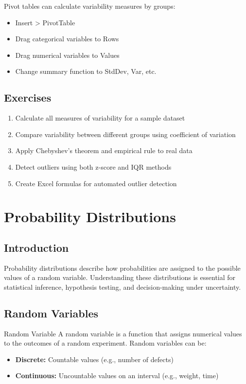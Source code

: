 \documentclass[12pt,a4paper]{book}
\begin{document}
Pivot tables can calculate variability measures by groups:
\begin{itemize}
    \item Insert > PivotTable
    \item Drag categorical variables to Rows
    \item Drag numerical variables to Values
    \item Change summary function to StdDev, Var, etc.
\end{itemize}

\section{Exercises}

\begin{enumerate}
    \item Calculate all measures of variability for a sample dataset
    \item Compare variability between different groups using coefficient of variation
    \item Apply Chebyshev's theorem and empirical rule to real data
    \item Detect outliers using both z-score and IQR methods
    \item Create Excel formulas for automated outlier detection
\end{enumerate}

\chapter{Probability Distributions}

\section{Introduction}

Probability distributions describe how probabilities are assigned to the possible values of a random variable. Understanding these distributions is essential for statistical inference, hypothesis testing, and decision-making under uncertainty.

\section{Random Variables}

\begin{definition}{Random Variable}
A random variable is a function that assigns numerical values to the outcomes of a random experiment. Random variables can be:
\begin{itemize}
    \item \textbf{Discrete:} Countable values (e.g., number of defects)
    \item \textbf{Continuous:} Uncountable values on an interval (e.g., weight, time)
\end{itemize}
\end{definition}
\end{document}
